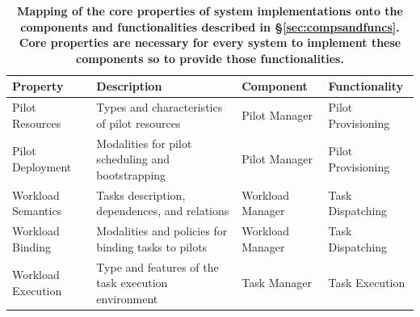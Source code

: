 \documentclass{sig-alternate}
\begin{document}
\begin{table}
\centering
\begin{tabular}{p{3cm}p{7.7cm}p{2.7cm}p{2.6cm}}

\toprule

\textbf{Property} &
\textbf{Description} &
\textbf{Component} &
\textbf{Functionality} \\

\midrule

Pilot Resources &
Types and characteristics of pilot resources &
Pilot Manager &
Pilot Provisioning \\

Pilot Deployment &
Modalities for pilot scheduling and bootstrapping &
Pilot Manager &
Pilot Provisioning \\

Workload Semantics &
Tasks description, dependences, and relations &
Workload Manager &
Task Dispatching \\

Workload Binding&
Modalities and policies for binding tasks to pilots &
Workload Manager&
Task Dispatching \\

Workload Execution &
Type and features of the task execution environment &
Task Manager &
Task Execution \\

\bottomrule

\end{tabular}
\caption{\textbf{Mapping of the core properties  of \pilot system
  implementations onto the components and functionalities described in
  \S\ref{sec:compsandfuncs}. Core properties are necessary for every \pilot
  system to implement these components so to provide those functionalities. } }
\label{table:core_properties}
\end{table}
\end{document}
